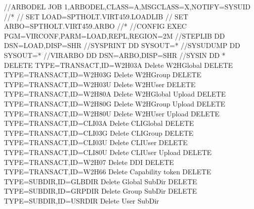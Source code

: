 \documentclass[letterpaper,10pt,english]{sphinxmanual}
\begin{document}
\begin{sphinxVerbatim}[commandchars=\\\{\}]
//\PYGZdl{}ARBODEL JOB 1,ARBODEL,CLASS=A,MSGCLASS=X,NOTIFY=\PYGZam{}SYSUID
//*
// SET LOAD=SPTHOLT.VIRT459.LOADLIB
// SET ARBO=SPTHOLT.VIRT459.ARBO
//*
//CONFIG  EXEC PGM=VIRCONF,PARM=\PYGZsq{}LOAD,REPL\PYGZsq{},REGION=2M
//STEPLIB  DD  DSN=\PYGZam{}LOAD,DISP=SHR
//SYSPRINT DD  SYSOUT=*
//SYSUDUMP DD  SYSOUT=*
//VIRARBO  DD  DSN=\PYGZam{}ARBO,DISP=SHR
//SYSIN      DD *
 DELETE TYPE=TRANSACT,ID=W2H\PYGZhy{}03A    Delete W2H\PYGZhy{}Global
 DELETE TYPE=TRANSACT,ID=W2H\PYGZhy{}03G    Delete W2H\PYGZhy{}Group
 DELETE TYPE=TRANSACT,ID=W2H\PYGZhy{}03U    Delete W2H\PYGZhy{}User
 DELETE TYPE=TRANSACT,ID=W2H\PYGZhy{}80A    Delete W2H\PYGZhy{}Global Upload
 DELETE TYPE=TRANSACT,ID=W2H\PYGZhy{}80G    Delete W2H\PYGZhy{}Group Upload
 DELETE TYPE=TRANSACT,ID=W2H\PYGZhy{}80U    Delete W2H\PYGZhy{}User Upload
 DELETE TYPE=TRANSACT,ID=CLI\PYGZhy{}03A    Delete CLI\PYGZhy{}Global
 DELETE TYPE=TRANSACT,ID=CLI\PYGZhy{}03G    Delete CLI\PYGZhy{}Group
 DELETE TYPE=TRANSACT,ID=CLI\PYGZhy{}03U    Delete CLI\PYGZhy{}User
 DELETE TYPE=TRANSACT,ID=CLI\PYGZhy{}80U    Delete CLI\PYGZhy{}User Upload
 DELETE TYPE=TRANSACT,ID=W2H\PYGZhy{}07     Delete DDI
 DELETE TYPE=TRANSACT,ID=W2H\PYGZhy{}66     Delete Capability token
 DELETE TYPE=SUBDIR,ID=GLB\PYGZhy{}DIR      Delete Global Sub\PYGZhy{}Dir
 DELETE TYPE=SUBDIR,ID=GRP\PYGZhy{}DIR      Delete Group Sub\PYGZhy{}Dir
 DELETE TYPE=SUBDIR,ID=USR\PYGZhy{}DIR      Delete User Sub\PYGZhy{}Dir
\end{sphinxVerbatim}

\ignorespaces 
\end{document}

